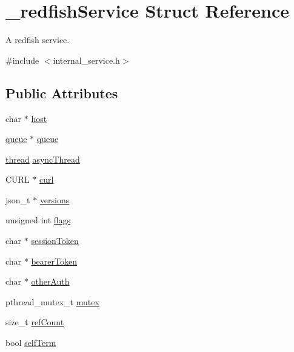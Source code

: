 \hypertarget{struct__redfishService}{}\section{\+\_\+redfish\+Service Struct Reference}
\label{struct__redfishService}


A redfish service.  




{\ttfamily \#include $<$internal\+\_\+service.\+h$>$}

\subsection*{Public Attributes}
\begin{DoxyCompactItemize}
\item 
char $\ast$ \hyperlink{struct__redfishService_a26ffe2775b68358d2ebc4eb4880fc141}{host}
\item 
\hyperlink{queue_8h_ae334156b4cde2f884517a660d81450cd}{queue} $\ast$ \hyperlink{struct__redfishService_a856c7f92721b1ae76efbb2bbfeae58bf}{queue}
\item 
\hyperlink{queue_8h_a1ab4f928aeccce6e6996ee96a4059c8a}{thread} \hyperlink{struct__redfishService_a9667f250bdf1205a6947d7ee63ee25ec}{async\+Thread}
\item 
C\+U\+RL $\ast$ \hyperlink{struct__redfishService_a73f37e9e9573d97909ae1b009fa00379}{curl}
\item 
json\+\_\+t $\ast$ \hyperlink{struct__redfishService_a380d0b9d53d04b26fe44f6abc703eb85}{versions}
\item 
unsigned int \hyperlink{struct__redfishService_a3e8935c6a0becddf4da72eef478fbd23}{flags}
\item 
char $\ast$ \hyperlink{struct__redfishService_ac8aa0c23ac4b611dc593c86be30633bc}{session\+Token}
\item 
char $\ast$ \hyperlink{struct__redfishService_a3959db858c9b279bcf379fc0a5eb7419}{bearer\+Token}
\item 
char $\ast$ \hyperlink{struct__redfishService_ac609c13e425bcdfbaaccd756c710a069}{other\+Auth}
\item 
pthread\+\_\+mutex\+\_\+t \hyperlink{struct__redfishService_abe36849d9372eafbabbc969b42d9b7d9}{mutex}
\item 
size\+\_\+t \hyperlink{struct__redfishService_a0fa4d4e758be848e53743461567c23c1}{ref\+Count}
\item 
bool \hyperlink{struct__redfishService_a84e8b26ce280c1e1a42c1a6b52ff56a1}{self\+Term}

\end{DoxyCompactItemize}
